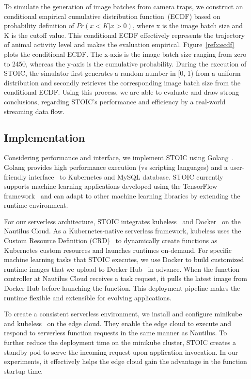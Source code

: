 To simulate the generation of image batches from camera traps, we construct an conditional empirical cumulative distribution function~(ECDF) based on probability definition of  $Pr(x < K | x > 0)$, where x is the image batch size and K is the cutoff value. This conditional ECDF effectively represents the trajectory of animal activity level and makes the evaluation empirical. Figure~\ref{ref:cecdf} plots the conditional ECDF. The x-axis is the image batch size ranging from zero to 2450, whereas the y-axis is the cumulative probability. During the execution of STOIC, the simulator first generates a random number in [0, 1) from a uniform distribution and secondly retrieves the corresponding image batch size from the conditional ECDF. Using this process, we are able to evaluate and draw strong conclusions, regarding STOIC's performance and efficiency by a real-world streaming data flow.



 \subsection{Implementation}

Considering performance and interface, we implement STOIC using Golang~\cite{ref:golang}. Golang provides high performance execution (vs scripting languages) and a user-friendly interface~\cite{ref:client-go} to Kubernetes and MySQL database. STOIC currently supports machine learning applications developed using the TensorFlow framework~\cite{ref:tensorflow} and can adapt to other machine learning libraries by extending the runtime environment.
 
For our serverless architecture, STOIC integrates kubeless~\cite{ref:kubeless} and Docker~\cite{ref:docker} on the Nautilus Cloud. As a Kubernetes-native serverless framework, kubeless uses the Custom Resource Definition (CRD)~\cite{ref:crd} to dynamically create functions as Kubernetes custom resources and launches runtimes on-demand. For specific machine learning tasks that STOIC executes, we use Docker to build customized runtime images that we upload to Docker Hub~\cite{ref:dockerhub} in advance. When the function controller at Nautilus Cloud receives a task request, it pulls the latest image from Docker Hub before launching the function. This deployment pipeline makes the runtime flexible and extensible for evolving applications. 
 
To create a consistent serverless environment, we install and configure minikube~\cite{ref:minikube} and kubeless~\cite{ref:kubeless} on the edge cloud. They enable the edge cloud to execute and respond to serverless function requests in the same manner as Nautilus. To further reduce the deployment time on the minikube cluster, STOIC creates a standby pod to serve the incoming request upon application invocation. In our experiments, it effectively helps the edge cloud gain the advantage in the function startup time. 

